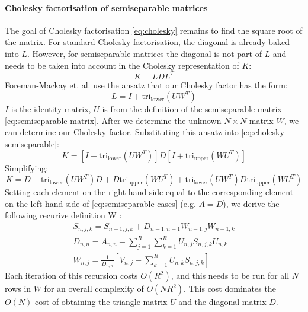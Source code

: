 \paragraph{Cholesky factorisation of semiseparable matrices}
The goal of Cholesky factorisation \ref{eq:cholesky} remains to find the square root of the matrix. For standard Cholesky factorisation, the diagonal is already baked into $L$. However, for semiseparable matrices the diagonal is not part of $L$ and needs to be taken into account in the Cholesky representation of $K$:
\begin{equation} \label{eq:cholesky-semiseparable}
    K = L D L^T
\end{equation}
Foreman-Mackay et. al. \cite{foreman-mackay} use the ansatz that our Cholesky factor has the form:
\begin{equation*}
    L = I + \text{tri}_{\text{lower}}(U W^T)
\end{equation*}
$I$ is the identity matrix, $U$ is from the definition of the semiseparable matrix \ref{eq:semiseparable-matrix}. After we determine the unknown $N \times N$ matrix $W$, we can determine our Cholesky factor. Substituting this ansatz into \ref{eq:cholesky-semiseparable}:
\begin{equation*}
    K = [I + \text{tri}_{\text{lower}}(U W^T)] D [I + \text{tri}_{\text{upper}}(W U^T)]
\end{equation*}
Simplifying:
\begin{equation*}
    K = D + \text{tri}_{\text{lower}}(U W^T) D + D \text{tri}_{\text{upper}}(W U^T) + \text{tri}_{\text{lower}}(U W^T) D \text{tri}_{\text{upper}}(W U^T)
\end{equation*}
Setting each element on the right-hand side equal to the corresponding element on the left-hand side of \ref{eq:semiseparable-cases} (e.g. $A = D$), we derive the following recurive definition W \cite{foreman-mackay}:
\begin{equation*}
    \begin{aligned}
        S_{n,j,k} = S_{n-1, j, k} + D_{n-1, n-1} W_{n-1,j} W_{n-1, k} \\
        D_{n,n} = A_{n,n} - \sum_{j=1}^{R} \sum_{k=1}^{R} U_{n,j} S_{n,j,k} U_{n,k} \\
        W_{n,j} = \frac{1}{D_{n,n}} \left[ V_{n,j} - \sum_{k=1}^{R} U_{n,k} S_{n,j,k} \right]
    \end{aligned}
\end{equation*}
Each iteration of this recursion costs $O(R^2)$, and this needs to be run for all $N$ rows in $W$ for an overall complexity of $O(N R^2)$. This cost dominates the $O(N)$ cost of obtaining the triangle matrix $U$ and the diagonal matrix $D$. 

